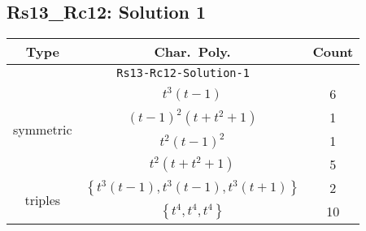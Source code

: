 \documentclass{article}
\begin{document}
        \subsection{Rs13\_Rc12: Solution 1}
        \begin{tabular}{|c|c|c|}
        \hline
        \textbf{Type} & \textbf{Char.~Poly.} & \textbf{Count} \\
        \hline \multicolumn{3}{|c|}{\texttt{Rs13-Rc12-Solution-1}} \\ \hline
        \multirow{4}{*}{symmetric}
        & $t^3(t - 1)$ & 6 \\
        & $(t - 1)^2(t + t^2 + 1)$ & 1 \\
        & $t^2(t - 1)^2$ & 1 \\
        & $t^2(t + t^2 + 1)$ & 5 \\
        \hline
        \multirow{2}{*}{triples}
         & $\left\{t^3(t - 1),t^3(t - 1),t^3(t + 1)\right\}$ & 2 \\
         & $\left\{t^4,t^4,t^4\right\}$ & 10 \\
        \hline
        \end{tabular}
        
        \newpage
        
\end{document}
